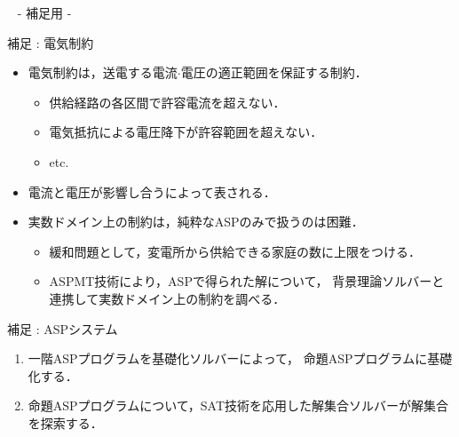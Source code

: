 \appendix
\backupbegin

\begin{frame}{~}
 \centering
 - 補足用 -
\end{frame} 

\begin{frame}{補足 : 電気制約}
 \begin{itemize}
  \item \alert{電気制約}は，送電する電流$\cdot$電圧の適正範囲を保証する制約．
  \begin{itemize}
   \item 供給経路の各区間で許容電流を超えない．
   \item 電気抵抗による電圧降下が許容範囲を超えない．
   \item etc.
  \end{itemize}
  \item 電流と電圧が影響し合うによって表される．
  \item 実数ドメイン上の制約は，純粋なASPのみで扱うのは\alert{困難}．
		\begin{itemize}
		 \item 緩和問題として，変電所から供給できる家庭の数に上限をつける．
		 \item ASPMT技術により，ASPで得られた解について，
			   背景理論ソルバーと連携して実数ドメイン上の制約を調べる．
		\end{itemize}
 \end{itemize}
\end{frame}

\begin{frame}{補足 : ASPシステム}
 
 \vspace{-0.5cm}

 \begin{figure}[htbp]
  \centering
  
 \end{figure}

 \vspace{-0.5cm}

 \begin{exampleblock}{}
  \begin{enumerate}
   \item 一階ASPプログラムを基礎化ソルバーによって，
		 命題ASPプログラムに\alert{基礎化}する．
   \item 命題ASPプログラムについて，SAT技術を応用した解集合ソルバーが解集合を探索する．
  \end{enumerate}
 \end{exampleblock}

\end{frame}

